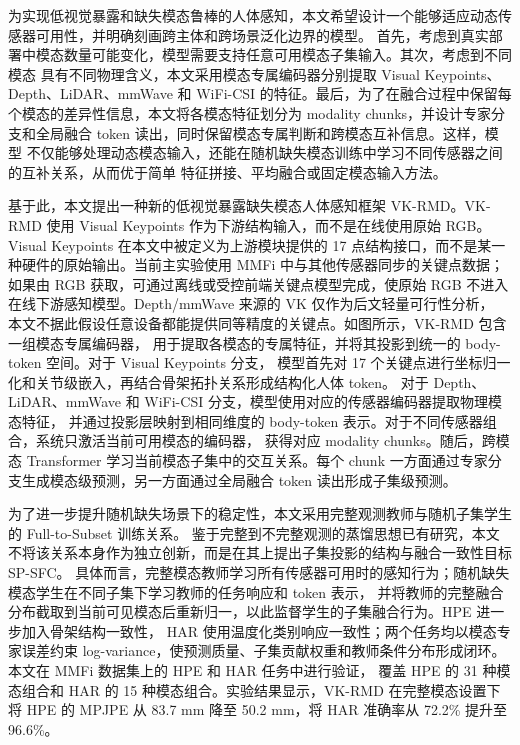 \documentclass[journal]{IEEEtran}
\begin{document}
为实现低视觉暴露和缺失模态鲁棒的人体感知，本文希望设计一个能够适应动态传感器可用性，并明确刻画跨主体和跨场景泛化边界的模型。
首先，考虑到真实部署中模态数量可能变化，模型需要支持任意可用模态子集输入。其次，考虑到不同模态
具有不同物理含义，本文采用模态专属编码器分别提取 Visual Keypoints、Depth、LiDAR、mmWave 和 
WiFi-CSI 的特征。最后，为了在融合过程中保留每个模态的差异性信息，本文将各模态特征划分为
modality chunks，并设计专家分支和全局融合 token 读出，同时保留模态专属判断和跨模态互补信息。这样，模型
不仅能够处理动态模态输入，还能在随机缺失模态训练中学习不同传感器之间的互补关系，从而优于简单
特征拼接、平均融合或固定模态输入方法。

基于此，本文提出一种新的低视觉暴露缺失模态人体感知框架 
VK-RMD。VK-RMD 使用 Visual Keypoints 作为下游结构输入，而不是在线使用原始 RGB。
Visual Keypoints 在本文中被定义为上游模块提供的 17 点结构接口，而不是某一种硬件的原始输出。当前主实验使用 MMFi 中与其他传感器同步的关键点数据；
如果由 RGB 获取，可通过离线或受控前端关键点模型完成，使原始 RGB 不进入在线下游感知模型。Depth/mmWave 来源的 VK 仅作为后文轻量可行性分析，
本文不据此假设任意设备都能提供同等精度的关键点。如图所示，VK-RMD 包含一组模态专属编码器，
用于提取各模态的专属特征，并将其投影到统一的 body-token 空间。对于 Visual Keypoints 分支，
模型首先对 17 个关键点进行坐标归一化和关节级嵌入，再结合骨架拓扑关系形成结构化人体 token。
对于 Depth、LiDAR、mmWave 和 WiFi-CSI 分支，模型使用对应的传感器编码器提取物理模态特征，
并通过投影层映射到相同维度的 body-token 表示。对于不同传感器组合，系统只激活当前可用模态的编码器，
获得对应 modality chunks。随后，跨模态 Transformer 学习当前模态子集中的交互关系。每个 chunk
一方面通过专家分支生成模态级预测，另一方面通过全局融合 token 读出形成子集级预测。

为了进一步提升随机缺失场景下的稳定性，本文采用完整观测教师与随机子集学生的 Full-to-Subset 训练关系。
鉴于完整到不完整观测的蒸馏思想已有研究，本文不将该关系本身作为独立创新，而是在其上提出子集投影的结构与融合一致性目标 SP-SFC。
具体而言，完整模态教师学习所有传感器可用时的感知行为；随机缺失模态学生在不同子集下学习教师的任务响应和 token 表示，
并将教师的完整融合分布截取到当前可见模态后重新归一，以此监督学生的子集融合行为。HPE 进一步加入骨架结构一致性，
HAR 使用温度化类别响应一致性；两个任务均以模态专家误差约束 log-variance，使预测质量、子集贡献权重和教师条件分布形成闭环。
本文在 MMFi 数据集上的 HPE 和 HAR 任务中进行验证，
覆盖 HPE 的 31 种模态组合和 HAR 的 15 种模态组合。实验结果显示，VK-RMD 在完整模态设置下将 
HPE 的 MPJPE 从 83.7 mm 降至 50.2 mm，将 HAR 准确率从 72.2\% 提升至 96.6\%。
\end{document}
